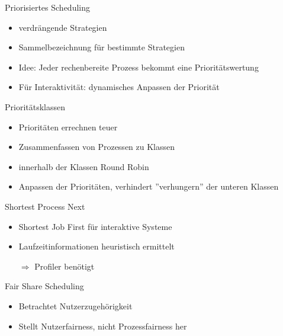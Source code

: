 \begin{frame}{Priorisiertes Scheduling}
	\begin{itemize}
		\item verdrängende Strategien
		\item Sammelbezeichnung für bestimmte Strategien
		\item Idee: Jeder rechenbereite Prozess bekommt eine Prioritätswertung
		\item Für Interaktivität: dynamisches Anpassen der Priorität 
	\end{itemize}
\end{frame}

\begin{frame}{Prioritätsklassen}
	\begin{itemize}
		\item Prioritäten errechnen teuer
		\item Zusammenfassen von Prozessen zu Klassen
		\item innerhalb der Klassen Round Robin
		\item Anpassen der Prioritäten, verhindert ''verhungern'' der unteren Klassen
	\end{itemize}
\end{frame}

\begin{frame}{Shortest Process Next}
	\begin{itemize}
		\item Shortest Job First für interaktive Systeme
		\item Laufzeitinformationen heuristisch ermittelt
		\item[\(\Rightarrow\)] Profiler benötigt
	\end{itemize}
\end{frame}

\begin{frame}{Fair Share Scheduling}
	\begin{itemize}
		\item Betrachtet Nutzerzugehörigkeit
		\item Stellt Nutzerfairness, nicht Prozessfairness her
	\end{itemize}
\end{frame}

